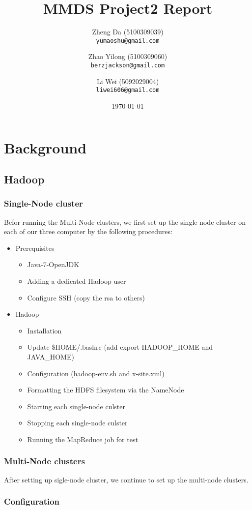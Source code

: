 \documentclass[a4paper]{article}
\title{MMDS Project2 Report}
\author{
Zheng Da (5100309039)\\
\small \texttt{yumaoshu@gmail.com}
\and
Zhao Yilong (5100309060)\\
\small \texttt{berzjackson@gmail.com}
\and
Li Wei (5092029004)\\
\small \texttt{liwei606@gmail.com}\\
}
\date{\today}
\begin{document}
\maketitle

\section{Background}

\subsection{Hadoop}

\subsubsection{Single-Node cluster}
Befor running the Multi-Node clusters, we first set up the single node cluster on each of our three computer by the following procedures:
\begin{itemize}
	\item Prerequisites
	\begin{itemize}
		\item Java-7-OpenJDK
		\item Adding a dedicated Hadoop user
		\item Configure SSH (copy the rsa to others)
	\end{itemize}
	\item Hadoop
	\begin{itemize}
		\item Installation
		\item Update \$HOME/.bashrc (add export HADOOP\_HOME and JAVA\_HOME)
		\item Configuration (hadoop-env.sh and x-site.xml)
		\item Formatting the HDFS filesystem via the NameNode
		\item Starting each single-node culster
		\item Stopping each single-node culster
		\item Running the MapReduce job for test
	\end{itemize}
\end{itemize}

\subsubsection{Multi-Node clusters}
After setting up sigle-node cluster, we continue to set up the multi-node clusters.
\subsubsection{Configuration}
\end{document}
